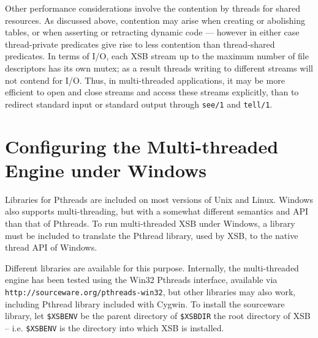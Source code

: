 Other performance considerations involve the contention by threads for
shared resources.  As discussed above, contention may arise when
creating or abolishing tables, or when asserting or retracting dynamic
code --- however in either case thread-private predicates give rise to
less contention than thread-shared predicates.  In terms of I/O, each
XSB stream up to the maximum number of file descriptors has its own
mutex; as a result threads writing to different streams will not
contend for I/O.  Thus, in multi-threaded applications, it may be more
efficient to open and close streams and access these streams
explicitly, than to redirect standard input or standard output through
{\tt see/1} and {\tt tell/1}.

\section{Configuring the Multi-threaded Engine under Windows} \label{sec:mt-windows}

Libraries for Pthreads are included on most versions of Unix and
Linux.  Windows also supports multi-threading, but with a somewhat
different semantics and API than that of Pthreads.  To run
multi-threaded XSB under Windows, a library must be included to
translate the Pthread library, used by XSB, to the native thread API
of Windows.

Different libraries are available for this purpose.  Internally, the
multi-threaded engine has been tested using the Win32 Pthreads
interface, available via {\tt http://sourceware.org/pthreads-win32},
but other libraries may also work, including Pthread library included
with Cygwin.  To install the sourceware library, let {\tt \$XSBENV} be
the parent directory of {\tt \$XSBDIR} the root directory of XSB --
i.e. {\tt \$XSBENV} is the directory into which XSB is installed.


